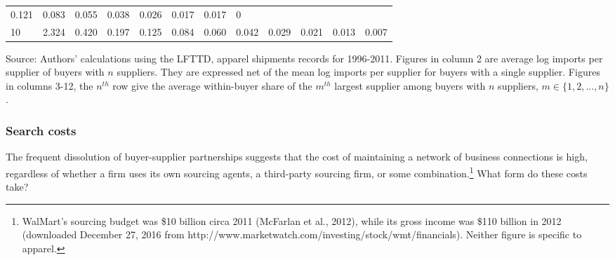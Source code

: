 \documentclass[12pt]{article} \usepackage{amsmath,amssymb,amsthm,geometry,graphicx,setspace,algorithm,algpseudocode,float}
\begin{document}
\begin{table}[htbp]
{\begin{tabular}{llllllllllll}
{0.121 } & {\small 0.083} & {\small 0.055} & {\small 0.038} & {\small 0.026 }
& {\small 0.017 } & {\small 0.017} & {\small 0} \\ 
{\small 10} & {\small 2.324} & {\small 0.420 } & {\small 0.197 } & {\small 0.125 } & {\small 0.084 } & {\small 0.060} & {\small 0.042 } & {\small 0.029 } & {\small 0.021} & {\small 0.013 } & {\small 0.007} \\
\bottomrule
\end{tabular}%
}
\begin{tablenotes}\footnotesize
\item Source: Authors' calculations using the  LFTTD, apparel shipments records for 1996-2011. Figures in column 2 are average log imports per supplier of buyers with $n$ suppliers. They are expressed net of the mean log imports per supplier for buyers with a single supplier. Figures in columns 3-12, the $n^{th}$ row give the average within-buyer share of the $m^{th}$ largest supplier among buyers with $n$ suppliers, $m \in \{1,2,...,n\}$.
\end{tablenotes}
\end{table}
\subsubsection{Search costs}
The frequent dissolution of buyer-supplier partnerships suggests that the cost of
maintaining a network of business connections is high, regardless of whether a firm uses its own sourcing agents, a third-party sourcing firm, or
some combination.\footnote{%
WalMart's sourcing budget was \$10 billion circa 2011 (McFarlan et al.,
2012), while its gross income was \$110 billion in 2012 (downloaded December
27, 2016 from http://www.marketwatch.com/investing/stock/wmt/financials).
Neither figure is specific to apparel.\medskip} 
What form do these costs take?
\end{document}
